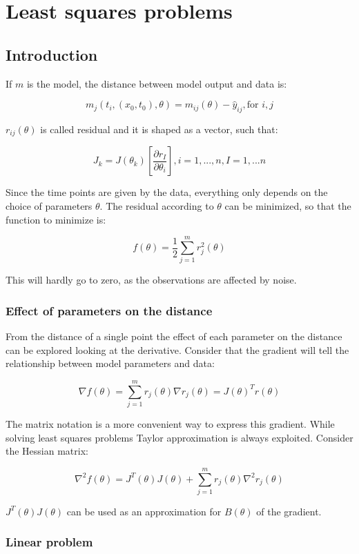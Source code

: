 \graphicspath{{chapters/10/images/}}
\chapter{Least squares problems}

\section{Introduction}
If $m$ is the model, the distance between model output and data is:

$$m_j(t_i,(x_0,t_0), \theta) = m_{ij}(\theta) - \hat{y}_{ij}, \text{for } i,j$$

$r_{ij}(\theta)$ is called residual and it is shaped as a vector, such that:

$$J_k=J(\theta_k)\left[\frac{\partial r_I}{\partial\theta_i}\right], i=1, ...,n, I=1,...n$$

Since the time points are given by the data, everything only depends on the choice of parameters $\theta$.
The residual according to $\theta$ can be minimized, so that the function to minimize is:

$$f(\theta)=\frac{1}{2}\sum^m_{j=1}r_j^2(\theta)$$

This will hardly go to zero, as the observations are affected by noise.

  \subsection{Effect of parameters on the distance}
  From the distance of a single point the effect of each parameter on the distance can be explored looking at the derivative.
  Consider that the gradient will tell the relationship between model parameters and data:

  $$\nabla f(\theta)=\sum^m_{j=1}r_j(\theta)\nabla r_j(\theta)= J(\theta)^Tr(\theta)$$

  The matrix notation is a more convenient way to express this gradient.
  While solving least squares problems Taylor approximation is always exploited.
  Consider the Hessian matrix:

  $$\nabla^2 f(\theta)=J^T(\theta)J(\theta)+ \sum^m_{j=1}r_j(\theta) \nabla^2 r_j(\theta)$$

  $J^T(\theta)J(\theta)$ can be used as an approximation for $B(\theta)$ of the gradient.

  \subsection{Linear problem}

